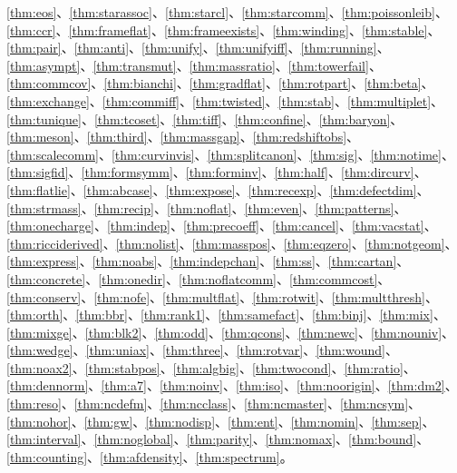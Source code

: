\documentclass[11pt,a4paper]{article}
\theoremstyle{sudef}
\begin{document}
\ref{thm:eos}、\ref{thm:starassoc}、\ref{thm:starcl}、\ref{thm:starcomm}、\ref{thm:poissonleib}、\ref{thm:ccr}、\ref{thm:frameflat}、\ref{thm:frameexists}、\ref{thm:winding}、\ref{thm:stable}、\ref{thm:pair}、\ref{thm:anti}、\ref{thm:unify}、\ref{thm:unifyiff}、\ref{thm:running}、\ref{thm:asympt}、\ref{thm:transmut}、\ref{thm:massratio}、\ref{thm:towerfail}、\ref{thm:commcov}、\ref{thm:bianchi}、\ref{thm:gradflat}、\ref{thm:rotpart}、\ref{thm:beta}、\ref{thm:exchange}、\ref{thm:commiff}、\ref{thm:twisted}、\ref{thm:stab}、\ref{thm:multiplet}、\ref{thm:tunique}、\ref{thm:tcoset}、\ref{thm:tiff}、\ref{thm:confine}、\ref{thm:baryon}、\ref{thm:meson}、\ref{thm:third}、\ref{thm:massgap}、\ref{thm:redshiftobs}、\ref{thm:scalecomm}、\ref{thm:curvinvis}、\ref{thm:splitcanon}、\ref{thm:sig}、\ref{thm:notime}、\ref{thm:sigfid}、\ref{thm:formsymm}、\ref{thm:forminv}、\ref{thm:half}、\ref{thm:dircurv}、\ref{thm:flatlie}、\ref{thm:abcase}、\ref{thm:expose}、\ref{thm:recexp}、\ref{thm:defectdim}、\ref{thm:strmass}、\ref{thm:recip}、\ref{thm:noflat}、\ref{thm:even}、\ref{thm:patterns}、\ref{thm:onecharge}、\ref{thm:indep}、\ref{thm:precoeff}、\ref{thm:cancel}、\ref{thm:vacstat}、\ref{thm:ricciderived}、\ref{thm:nolist}、\ref{thm:masspos}、\ref{thm:eqzero}、\ref{thm:notgeom}、\ref{thm:express}、\ref{thm:noabs}、\ref{thm:indepchan}、\ref{thm:ss}、\ref{thm:cartan}、\ref{thm:concrete}、\ref{thm:onedir}、\ref{thm:noflatcomm}、\ref{thm:commcost}、\ref{thm:conserv}、\ref{thm:nofe}、\ref{thm:multflat}、\ref{thm:rotwit}、\ref{thm:multthresh}、\ref{thm:orth}、\ref{thm:bbr}、\ref{thm:rank1}、\ref{thm:samefact}、\ref{thm:binj}、\ref{thm:mix}、\ref{thm:mixge}、\ref{thm:blk2}、\ref{thm:odd}、\ref{thm:qcons}、\ref{thm:newc}、\ref{thm:nouniv}、\ref{thm:wedge}、\ref{thm:uniax}、\ref{thm:three}、\ref{thm:rotvar}、\ref{thm:wound}、\ref{thm:noax2}、\ref{thm:stabpos}、\ref{thm:algbig}、\ref{thm:twocond}、\ref{thm:ratio}、\ref{thm:dennorm}、\ref{thm:a7}、\ref{thm:noinv}、\ref{thm:iso}、\ref{thm:noorigin}、\ref{thm:dm2}、\ref{thm:reso}、\ref{thm:ncdefm}、\ref{thm:ncclass}、\ref{thm:ncmaster}、\ref{thm:ncsym}、\ref{thm:nohor}、\ref{thm:gw}、\ref{thm:nodisp}、\ref{thm:ent}、\ref{thm:nomin}、\ref{thm:sep}、\ref{thm:interval}、\ref{thm:noglobal}、\ref{thm:parity}、\ref{thm:nomax}、\ref{thm:bound}、\ref{thm:counting}、\ref{thm:afdensity}、\ref{thm:spectrum}。
\end{document}
